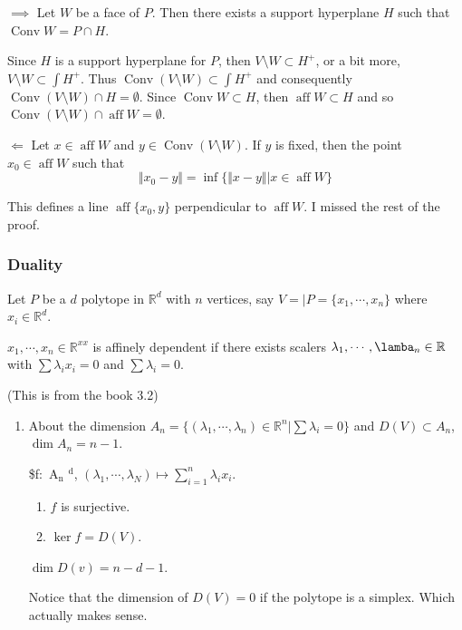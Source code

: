 \documentclass[11pt]{article}
\def\R{\mathbb{R}}
\def\aff{\operatorname{aff}}
\def\conv{\operatorname{Conv}}
\begin{document}
{{{\begin{enumerate}
\(\implies\) Let \(W\) be a face of \(P\). Then there exists a support hyperplane
\(H\) such that \(\conv W = P \cap H\).

Since \(H\) is a support hyperplane for \(P\), then \(V \setminus W \subset
     H^{+}\), or a bit more, \(V \setminus W \subset \int H^{ +}\). Thus \(\conv(V
     \setminus W) \subset \int H^{ + }\) and consequently \(\conv(V \setminus W)
     \cap H = \emptyset\). Since \(\conv W \subset H\), then \(\aff W \subset H\) and
so \(\conv (V \setminus W) \cap \aff W = \emptyset\).

\(\Leftarrow\) Let \(x \in \aff W\) and \(y \in \conv(V \setminus W)\). If \(y\) is
fixed, then the point \(x_0 \in \aff W\) such that $$\Vert x_0 - y \Vert =
     \inf \{ \Vert x - y \Vert \vert x \in \aff W\}$$

This defines a line \(\aff \{x_0, y\}\) perpendicular to \(\aff W\). I missed
the rest of the proof.
\end{enumerate}
\subsubsection{Duality}
\label{sec:orga080e4f}
Let \(P\) be a \(d\) polytope in \(\R^d\) with \(n\) vertices, say \(V = \vert P
    =\{x_1, \cdots, x_n\}\) where \(x_i \in \R^d\).

\(x_1, \cdots, x_n \in \R^{xx}\) is affinely dependent if there exists
scalers \(\lambda_1, \cdots, \lamba_n \in \R\) with \(\sum \lambda_i x_i = 0\)
and \(\sum \lambda_i = 0\).

(This is from the book 3.2)
\begin{enumerate}
\item About the dimension
\label{sec:orgfe4d96e}
\(A_n = \{(\lambda_1, \cdots, \lambda_n) \in \R^n \vert \sum \lambda_i =
     0\}\) and \(D(V) \subset A_n\), \(\dim A_n = n-1\).

\$f\(\colon\) A\(_{\text{n}}\) \mapsto \R\(^{\text{d}}\), \((\lambda_1, \cdots, \lambda_N) \mapsto
     \sum_{i=1}^{n} \lambda_i x_i\).

\begin{enumerate}
\item \(f\) is surjective.

\item \(\ker f = D(V)\).
\end{enumerate}

\(\dim D(v) = n - d- 1\).

Notice that the dimension of \(D(V) = 0\) if the polytope is a simplex. Which
actually makes sense.
\end{enumerate}
}}}
\end{document}
